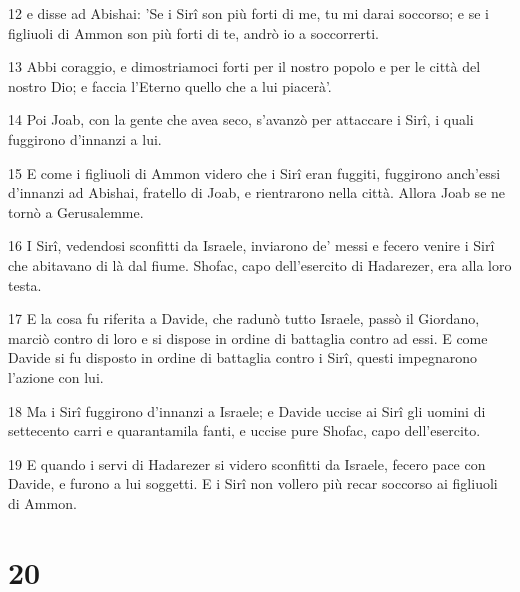 \par 12 e disse ad Abishai: 'Se i Sirî son più forti di me, tu mi darai soccorso; e se i figliuoli di Ammon son più forti di te, andrò io a soccorrerti.
\par 13 Abbi coraggio, e dimostriamoci forti per il nostro popolo e per le città del nostro Dio; e faccia l'Eterno quello che a lui piacerà'.
\par 14 Poi Joab, con la gente che avea seco, s'avanzò per attaccare i Sirî, i quali fuggirono d'innanzi a lui.
\par 15 E come i figliuoli di Ammon videro che i Sirî eran fuggiti, fuggirono anch'essi d'innanzi ad Abishai, fratello di Joab, e rientrarono nella città. Allora Joab se ne tornò a Gerusalemme.
\par 16 I Sirî, vedendosi sconfitti da Israele, inviarono de' messi e fecero venire i Sirî che abitavano di là dal fiume. Shofac, capo dell'esercito di Hadarezer, era alla loro testa.
\par 17 E la cosa fu riferita a Davide, che radunò tutto Israele, passò il Giordano, marciò contro di loro e si dispose in ordine di battaglia contro ad essi. E come Davide si fu disposto in ordine di battaglia contro i Sirî, questi impegnarono l'azione con lui.
\par 18 Ma i Sirî fuggirono d'innanzi a Israele; e Davide uccise ai Sirî gli uomini di settecento carri e quarantamila fanti, e uccise pure Shofac, capo dell'esercito.
\par 19 E quando i servi di Hadarezer si videro sconfitti da Israele, fecero pace con Davide, e furono a lui soggetti. E i Sirî non vollero più recar soccorso ai figliuoli di Ammon.

\chapter{20}

